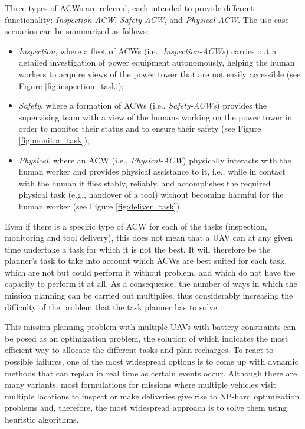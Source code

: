 Three types of \glspl{ACW} are referred, each intended to provide different functionality: \textit{Inspection-ACW}, \textit{Safety-ACW}, and \textit{Physical-ACW}. The use case scenarios can be summarized as follows: 

\begin{itemize}
    \item \textit{Inspection}, where a fleet of \glspl{ACW} (i.e., \textit{Inspection-ACWs}) carries out a detailed investigation of power equipment autonomously, helping the human workers to acquire views of the power tower that are not easily accessible (see Figure \ref{fig:inspection_task});
    \item \textit{Safety}, where a formation of \glspl{ACW} (i.e., \textit{Safety-ACWs}) provides the supervising team with a view of the humans working on the power tower in order to monitor their status and to ensure their safety (see Figure \ref{fig:monitor_task});
    \item \textit{Physical}, where an \gls{ACW} (i.e., \textit{Physical-ACW}) physically interacts with the human worker and provides physical assistance to it, i.e., while in contact with the human it flies stably, reliably, and accomplishes the required physical task (e.g., handover of a tool) without becoming harmful for the human worker (see Figure \ref{fig:deliver_task}).
\end{itemize} 

Even if there is a specific type of \gls{ACW} for each of the tasks (inspection, monitoring and tool delivery), this does not mean that a \gls{UAV} can at any given time undertake a task for which it is not the best. It will therefore be the planner's task to take into account which \glspl{ACW} are best suited for each task, which are not but could perform it without problem, and which do not have the capacity to perform it at all. As a consequence, the number of ways in which the mission planning can be carried out multiplies, thus considerably increasing the difficulty of the problem that the task planner has to solve.

This mission planning problem with multiple \glspl{UAV} with battery constraints can be posed as an optimization problem, the solution of which indicates the most efficient way to allocate the different tasks and plan recharges. To react to possible failures, one of the most widespread options is to come up with dynamic methods that can replan in real time as certain events occur. Although there are many variants, most formulations for missions where multiple vehicles visit multiple locations to inspect or make deliveries give rise to NP-hard optimization problems and, therefore, the most widespread approach is to solve them using heuristic algorithms.


